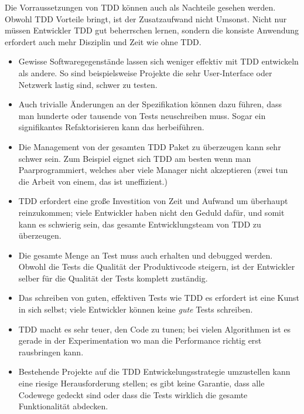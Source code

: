 \documentclass{mitschrift}
\begin{document}
Die Vorraussetzungen von TDD können auch als Nachteile gesehen werden.
Obwohl TDD Vorteile bringt, ist der Zusatzaufwand nicht Umsonst. Nicht nur
müssen Entwickler TDD gut beherrschen lernen, sondern die konsiste Anwendung
erfordert auch mehr Disziplin und Zeit wie ohne TDD.

\begin{itemize}
    \item Gewisse Softwaregegenstände lassen sich weniger effektiv mit TDD
        entwickeln als andere. So sind beispielsweise Projekte die sehr
        User-Interface oder Netzwerk lastig sind, schwer zu testen.
    \item Auch trivialle Änderungen an der Spezifikation können dazu führen,
        dass man hunderte oder tausende von Tests neuschreiben muss. Sogar
        ein signifikantes Refaktorisieren kann das herbeiführen.
        \cite{StackExchange}
    \item Die Management von der gesamten TDD Paket zu überzeugen kann sehr
        schwer sein. Zum Beispiel eignet sich TDD am besten wenn man
        Paarprogrammiert, welches aber viele Manager nicht akzeptieren (zwei
        tun die Arbeit von einem, das ist uneffizient.) \cite{StackOverflow}
    \item TDD erfordert eine große Investition von Zeit und Aufwand um
        überhaupt reinzukommen; viele Entwickler haben nicht den Geduld dafür,
        und somit kann es schwierig sein, das gesamte Entwicklungsteam von TDD
        zu überzeugen. \cite{StackOverflow}
    \item Die gesamte Menge an Test muss auch erhalten und debugged werden.
        Obwohl die Tests die Qualität der Produktivcode steigern, ist der
        Entwickler selber für die Qualität der Tests komplett zuständig.
    \item Das schreiben von guten, effektiven Tests wie TDD es erfordert ist
        eine Kunst in sich selbst; viele Entwickler können keine \emph{gute}
        Tests schreiben. \cite{StackOverflow}
    \item TDD macht es sehr teuer, den Code zu tunen; bei vielen Algorithmen
        ist es gerade in der Experimentation wo man die Performance richtig
        erst rausbringen kann. \cite{StackOverflow}
    \item Bestehende Projekte auf die TDD Entwickelungsstrategie umzustellen
        kann eine riesige Herausforderung stellen; es gibt keine Garantie, dass
        alle Codewege gedeckt sind oder dass die Tests wirklich die gesamte
        Funktionalität abdecken.
\end{itemize}
\end{document}
